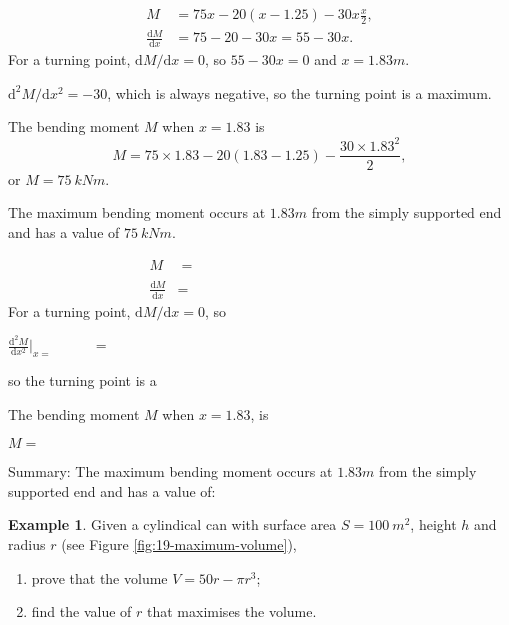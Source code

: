\documentclass[
  english,
  11pt,
  oneside]{book}
\providecommand{\tightlist}{%
  \setlength{\itemsep}{0pt}\setlength{\parskip}{0pt}}
\newcommand{\slide}{}
\theoremstyle{definition}
\theoremstyle{definition}
\newtheorem{example}{Example}[chapter]
\theoremstyle{definition}
\theoremstyle{definition}
\theoremstyle{remark}
\begin{document}
\begin{notslides}

\begin{align*}
M &= 75x - 20(x-1.25) - 30x\frac{x}{2},\\
\frac{\mathrm{d}M}{\mathrm{d} x} &= 75-20-30x = 55 - 30x.
\end{align*}
For a turning point, \(\mathrm{d}M/\mathrm{d}x=0\), so \(55 - 30x = 0\) and \(x = 1.83 m\).

\(\mathrm{d}^2M/\mathrm{d}x^2 = -30\), which is always negative, so the turning point is a maximum.

The bending moment \(M\) when \(x = 1.83\) is
\[
M = 75\times1.83 - 20(1.83 - 1.25) - \frac{30\times1.83^2}{2},
\]
or \(M = 75\ kNm\).

The maximum bending moment occurs at \(1.83 m\) from the simply supported end and has a value of \(75\ kNm\).

\end{notslides}

\begin{slidesonly}

\begin{align*}
M &= \phantom{75x - 20(x-1.25) - 30x\frac{x}{2}}\\
\frac{\mathrm{d}M}{\mathrm{d} x} &= 
\end{align*}
For a turning point, \(\mathrm{d}M/\mathrm{d}x=0\), so

\vfill

\(\frac{\mathrm{d}^2M}{\mathrm{d}x^2}\Big|_{x=\phantom{asdfasdf}} =\)

so the turning point is a

\slide

The bending moment \(M\) when \(x = 1.83\), is

\(M=\)

\vfill

Summary: The maximum bending moment occurs at \(1.83m\) from the simply supported end and has a value of:
\slide

\end{slidesonly}

\begin{example}

Given a cylindical can with surface area \(S=100\ m^2\), height \(h\) and radius \(r\) (see Figure \ref{fig:19-maximum-volume}),

\begin{enumerate}
\def\labelenumi{\arabic{enumi}.}
\tightlist
\item
  prove that the volume \(V = 50r-\pi r^3\);
\item
  find the value of \(r\) that maximises the volume.
\end{enumerate}

\end{example}
\end{document}
